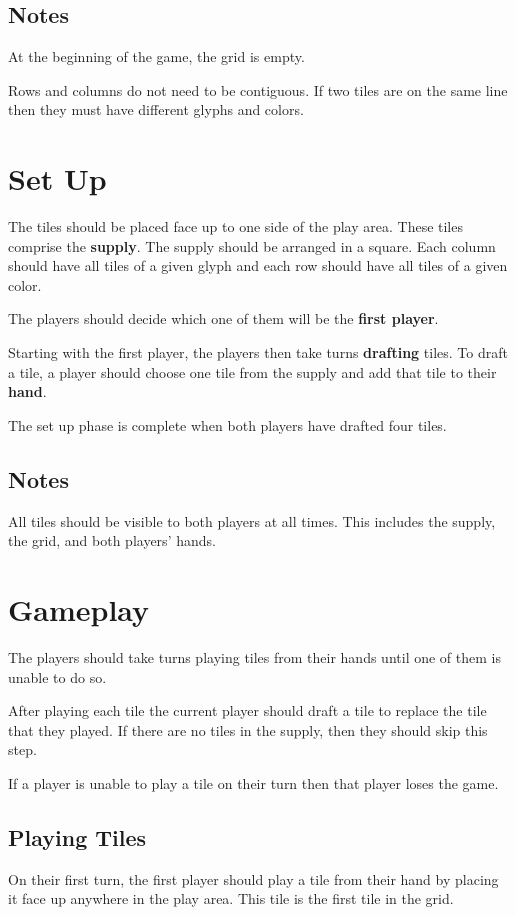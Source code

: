\documentclass[a4paper, 10pt, notumble]{leaflet}
\begin{document}
\subsection{Notes}
At the beginning of the game, the grid is empty.

Rows and columns do not need to be contiguous.
If two tiles are on the same line then they must have different glyphs and colors.

\section{Set Up}
The tiles should be placed face up to one side of the play area. These tiles comprise the \textbf{supply}. The supply should be arranged in a square. Each column should have all tiles of a given glyph and each row should have all tiles of a given color.

The players should decide which one of them will be the \textbf{first player}.

Starting with the first player, the players then take turns \textbf{drafting} tiles. To draft a tile, a player should choose one tile from the supply and add that tile to their \textbf{hand}.

The set up phase is complete when both players have drafted four tiles.

\subsection{Notes}
All tiles should be visible to both players at all times.  This includes the supply, the grid, and both players' hands.

\newpage

\section{Gameplay}
The players should take turns playing tiles from their hands until one of them is unable to do so.

After playing each tile the current player should draft a tile to replace the tile that they played. If there are no tiles in the supply, then they should skip this step.

If a player is unable to play a tile on their turn then that player loses the game.

\subsection{Playing Tiles}
On their first turn, the first player should play a tile from their hand by placing it face up anywhere in the play area. This tile is the first tile in the grid.
\end{document}
